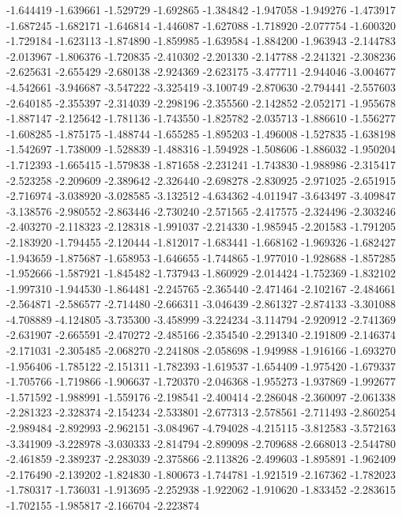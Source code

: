 -1.644419
-1.639661
-1.529729
-1.692865
-1.384842
-1.947058
-1.949276
-1.473917
-1.687245
-1.682171
-1.646814
-1.446087
-1.627088
-1.718920
-2.077754
-1.600320
-1.729184
-1.623113
-1.874890
-1.859985
-1.639584
-1.884200
-1.963943
-2.144783
-2.013967
-1.806376
-1.720835
-2.410302
-2.201330
-2.147788
-2.241321
-2.308236
-2.625631
-2.655429
-2.680138
-2.924369
-2.623175
-3.477711
-2.944046
-3.004677
-4.542661
-3.946687
-3.547222
-3.325419
-3.100749
-2.870630
-2.794441
-2.557603
-2.640185
-2.355397
-2.314039
-2.298196
-2.355560
-2.142852
-2.052171
-1.955678
-1.887147
-2.125642
-1.781136
-1.743550
-1.825782
-2.035713
-1.886610
-1.556277
-1.608285
-1.875175
-1.488744
-1.655285
-1.895203
-1.496008
-1.527835
-1.638198
-1.542697
-1.738009
-1.528839
-1.488316
-1.594928
-1.508606
-1.886032
-1.950204
-1.712393
-1.665415
-1.579838
-1.871658
-2.231241
-1.743830
-1.988986
-2.315417
-2.523258
-2.209609
-2.389642
-2.326440
-2.698278
-2.830925
-2.971025
-2.651915
-2.716974
-3.038920
-3.028585
-3.132512
-4.634362
-4.011947
-3.643497
-3.409847
-3.138576
-2.980552
-2.863446
-2.730240
-2.571565
-2.417575
-2.324496
-2.303246
-2.403270
-2.118323
-2.128318
-1.991037
-2.214330
-1.985945
-2.201583
-1.791205
-2.183920
-1.794455
-2.120444
-1.812017
-1.683441
-1.668162
-1.969326
-1.682427
-1.943659
-1.875687
-1.658953
-1.646655
-1.744865
-1.977010
-1.928688
-1.857285
-1.952666
-1.587921
-1.845482
-1.737943
-1.860929
-2.014424
-1.752369
-1.832102
-1.997310
-1.944530
-1.864481
-2.245765
-2.365440
-2.471464
-2.102167
-2.484661
-2.564871
-2.586577
-2.714480
-2.666311
-3.046439
-2.861327
-2.874133
-3.301088
-4.708889
-4.124805
-3.735300
-3.458999
-3.224234
-3.114794
-2.920912
-2.741369
-2.631907
-2.665591
-2.470272
-2.485166
-2.354540
-2.291340
-2.191809
-2.146374
-2.171031
-2.305485
-2.068270
-2.241808
-2.058698
-1.949988
-1.916166
-1.693270
-1.956406
-1.785122
-2.151311
-1.782393
-1.619537
-1.654409
-1.975420
-1.679337
-1.705766
-1.719866
-1.906637
-1.720370
-2.046368
-1.955273
-1.937869
-1.992677
-1.571592
-1.988991
-1.559176
-2.198541
-2.400414
-2.286048
-2.360097
-2.061338
-2.281323
-2.328374
-2.154234
-2.533801
-2.677313
-2.578561
-2.711493
-2.860254
-2.989484
-2.892993
-2.962151
-3.084967
-4.794028
-4.215115
-3.812583
-3.572163
-3.341909
-3.228978
-3.030333
-2.814794
-2.899098
-2.709688
-2.668013
-2.544780
-2.461859
-2.389237
-2.283039
-2.375866
-2.113826
-2.499603
-1.895891
-1.962409
-2.176490
-2.139202
-1.824830
-1.800673
-1.744781
-1.921519
-2.167362
-1.782023
-1.780317
-1.736031
-1.913695
-2.252938
-1.922062
-1.910620
-1.833452
-2.283615
-1.702155
-1.985817
-2.166704
-2.223874
